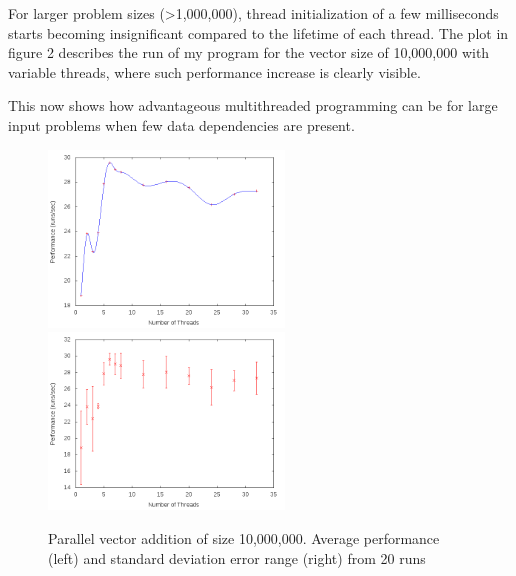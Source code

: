 \documentclass{article}
\begin{document}
  For larger problem sizes (\textgreater1,000,000), thread initialization of a few milliseconds starts becoming insignificant compared to the lifetime of each thread.
  The plot in figure 2 describes the run of my program for the vector size of 10,000,000 with variable threads, where such performance increase is clearly visible.

  This now shows how advantageous multithreaded programming can be for large input problems when few data dependencies are present.

\begin{figure}[t]
\centerline{%
\includegraphics[width=0.56\textwidth]{10M_lines}%
\includegraphics[width=0.56\textwidth]{10M_errorbars}%
}%
\caption{Parallel vector addition of size 10,000,000. Average performance (left) and standard deviation error range (right) from 20 runs}
\end{figure}

\clearpage

\newpage
\newpage\newpage\newpage\newpage
  
  
  
\end{document}
